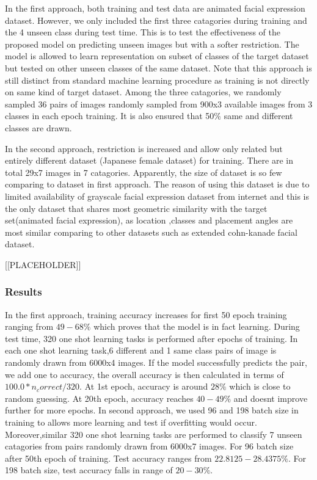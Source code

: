 \documentclass{article}
\begin{document}
In the first approach, both training and test data are animated facial expression dataset. However, we only included the first three catagories during training and the 4 unseen class during test time. This is to test the effectiveness of the proposed model on predicting unseen images but with a softer restriction. The model is allowed to learn representation on subset of classes of the target dataset but tested on other unseen classes of the same dataset. Note that this approach is still distinct from standard machine learning procedure as training is not directly on same kind of target dataset. Among the three catagories, we randomly sampled 36 pairs of images randomly sampled from 900x3 available images from 3 classes in each epoch training. It is also ensured that 50$\%$ same and different classes are drawn.

In the second approach, restriction is increased and allow only related but entirely different dataset (Japanese female dataset) for 
training. There are in total 29x7 images in 7 catagories. Apparently, the size of dataset is so few comparing to dataset in first
approach. The reason of using this dataset is due to limited availability of grayscale facial expression dataset from internet and this is the only dataset that shares most geometric similarity with the target set(animated facial expression), as location ,classes and placement angles are most similar comparing to other datasets such as extended cohn-kanade facial dataset.

[[PLACEHOLDER]]

\subsubsection{\textbf{Results}}

In the first approach, training accuracy increases for first 50 epoch training ranging from $49-68\%$ which proves that the model is in fact learning. During test time, 320 one shot learning tasks is performed after epochs of training. In each one shot learning task,6 different and 1 same class pairs of image is randomly drawn from 6000x4 images. If the model successfully predicts the pair, we add one to accuracy, the overall accuracy is then calculated in terms of $100.0*n_correct / 320$. At 1st epoch, accuracy is around $28\%$ which is close to random guessing. At 20th epoch, accuracy reaches $40-49\%$ and doesnt improve further for more epochs. In second approach, we used 96 and 198 batch size in training to allows more learning and test if overfitting would occur. Moreover,similar 320 one shot learning tasks are performed to classify 7 unseen catagories from pairs randomly drawn from 6000x7 images. For 96 batch size after 50th epoch of training. Test accuracy ranges from $22.8125-28.4375\%$. For 198 batch size, test accuracy falls in range of $20-30\%$.
\end{document}
